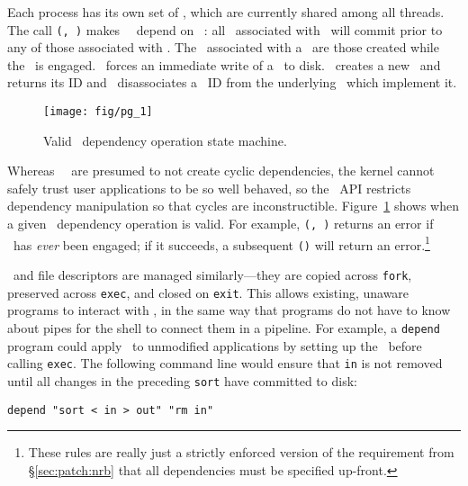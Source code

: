 Each process has its own set of \patchgroups, which are currently shared
among all threads.
%
The call \texttt{\pgDepend(\pgQg, \pgPg)} makes \patchgroup\ \pgQg\ depend on
\patchgroup\ \pgPg: all \patches\ associated with \pgPg\ will
commit prior to any of those associated with \pgQg.
%
The \patches\ associated with a \patchgroup\ are those created while
the \patchgroup\ is engaged.
%
\pgSync\ forces an immediate write of a \patchgroup\ to disk.
%
\pgCreate\ creates a new \patchgroup\ and returns its ID
%
and \pgClose\ disassociates a \patchgroup\ ID from the underlying
\patches\ which implement it.

\begin{figure}[t]
\centering
\texttt{[image: fig/pg\_1]}
\caption{\label{fig:patchgroup-transitions} Valid \patchgroup\
  dependency operation state machine.}
\end{figure}
%
Whereas \Kudos\ \modules\ are presumed to not create cyclic
dependencies, the kernel cannot safely trust user applications to be
so well behaved, so
%
the \patchgroup\ API restricts dependency manipulation so that cycles are
inconstructible.
%
Figure~\ref{fig:patchgroup-transitions} shows when a given
\patchgroup\ dependency operation is valid.
%
For example, \texttt{\pgDepend(\pgQg, \pgPg)} returns an error if
\pgQg\ has \emph{ever} been engaged; if it succeeds, a subsequent
\texttt{\pgEngage(\pgPg)} will return an error.\footnote{These rules are really
just a strictly enforced version of the requirement from \S\ref{sec:patch:nrb}
that all dependencies must be specified up-front.}

\Patchgroups\ and file descriptors are managed similarly---they are copied
across \texttt{fork}, preserved across \texttt{exec}, and closed on
\texttt{exit}.
%
This allows existing, unaware programs to interact with \patchgroups,
in the same way that programs do not have to know about pipes for the
shell to connect them in a pipeline.
%
For example, a \texttt{depend} program could apply \patchgroups\ to
unmodified applications by setting up the \patchgroups\ before calling
\texttt{exec}.  The following command line would ensure that \texttt{in} is
not removed until all changes in the preceding \texttt{sort} have committed
to disk:

\vspace{-0.5\baselineskip}
\begin{center}
\begin{small}
\verb+depend "sort < in > out" "rm in"+
\end{small}
\end{center}
\vspace{-0.5\baselineskip}

